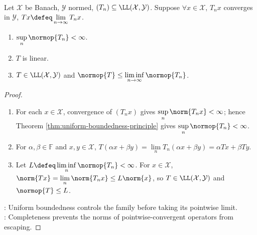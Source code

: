 \begin{corollary} \label{cor:banach-steinhaus-pointwise-limits} \\
Let $\mathcal{X}$ be Banach, $\mathcal{Y}$ normed, $(T_n)\subseteq\LL(\mathcal{X},\mathcal{Y})$. Suppose $\forall x\in\mathcal{X}$, $T_nx$ converges in $\mathcal{Y}$, $Tx\defeq\lim\limits_{n\to\infty}T_nx$.
\begin{enumerate}[label=(\roman*)]
\setlength{\itemsep}{0pt}
\item $\sup\limits_n\normop{T_n}<\infty$.
\item $T$ is linear.
\item $T\in\LL(\mathcal{X},\mathcal{Y})$ and $\normop{T}\leq\liminf\limits_{n\to\infty}\normop{T_n}$.
\end{enumerate}
\begin{proof}
\begin{enumerate}[label=(\roman*)]
\setlength{\itemsep}{0pt}
\item For each $x\in\mathcal X$, convergence of $(T_nx)$ gives $\sup\limits_n\norm{T_nx}<\infty$; hence Theorem \ref{thm:uniform-boundedness-principle} gives $\sup\limits_n\normop{T_n}<\infty$.
\item For $\alpha,\beta\in\mathbb F$ and $x,y\in\mathcal X$, $T(\alpha x+\beta y)=\lim\limits_nT_n(\alpha x+\beta y)=\alpha Tx+\beta Ty$.
\item Let $L\defeq\liminf\limits_n\normop{T_n}<\infty$. For $x\in\mathcal X$, $\norm{Tx}=\lim\limits_n\norm{T_nx}\leq L\norm{x}$, so $T\in\LL(\mathcal X,\mathcal Y)$ and $\normop{T}\leq L$.
\end{enumerate}
: Uniform boundedness controls the family before taking its pointwise limit.\\
: Completeness prevents the norms of pointwise-convergent operators from escaping.
\end{proof}
\end{corollary}
